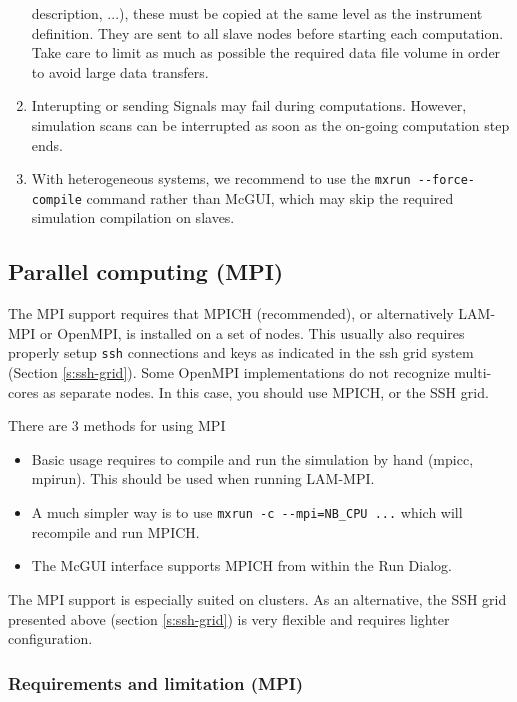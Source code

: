 \begin{enumerate}
{      description, ...), these must be copied at the same level as the instrument 
      definition. They are sent to all slave nodes before starting each computation.
      Take care to limit as much as possible the required data file volume in order
      to avoid large data transfers.}
  \item Interupting or sending Signals may fail during computations. However, 
  simulation scans can be interrupted as soon as the on-going computation 
  step ends.
  \item With heterogeneous systems, we recommend to use the \verb+mxrun --force-compile+ 
    command rather than McGUI, which may skip the required simulation compilation
    on slaves.
  \end{enumerate}

\subsection{Parallel computing (MPI)}
\label{s:mpi}
The MPI support requires that MPICH (recommended), or alternatively LAM-MPI or 
  OpenMPI, is installed on a set of nodes. This usually also requires properly 
  setup \texttt{ssh} connections and keys as indicated in the ssh grid system 
  (Section \ref{s:ssh-grid}). Some OpenMPI implementations do not recognize 
  multi-cores as separate nodes. In this case, you should use MPICH, or the SSH grid.

There are 3 methods for using MPI
\begin{itemize}
\item Basic usage requires to compile and run the simulation by hand (mpicc, mpirun). 
  This should be used when running LAM-MPI.
\item A much simpler way is to use \verb+mxrun -c --mpi=NB_CPU ...+ which will 
  recompile and run MPICH.
\item The McGUI interface supports MPICH from within the Run Dialog.
\end{itemize}

The MPI support is especially suited on clusters. As an alternative, the SSH grid 
presented above (section \ref{s:ssh-grid}) is very flexible and requires lighter 
configuration.

\subsubsection{Requirements and limitation (MPI)}


